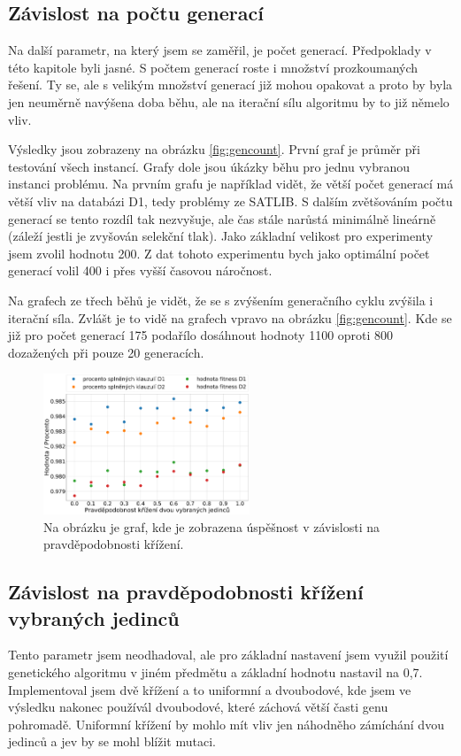 \documentclass[11pt]{article}
\begin{document}
\subsection{Závislost na počtu generací}
Na další parametr, na který jsem se zaměřil, je počet generací. Předpoklady v této kapitole byli jasné. S počtem generací roste i množství prozkoumaných řešení. Ty se, ale s velikým množství generací již mohou opakovat a proto by byla jen neuměrně navýšena doba běhu, ale na iterační sílu algoritmu by to již němelo vliv. 

Výsledky jsou zobrazeny na obrázku \ref{fig:gencount}. První graf je průměr při testování všech instancí. Grafy dole jsou úkázky běhu pro jednu vybranou instanci problému. Na prvním grafu je například vidět, že větší počet generací má větší vliv  na databázi D1, tedy problémy ze SATLIB. S dalším zvětšováním počtu generací se tento rozdíl tak nezvyšuje, ale čas stále narůstá minimálně lineárně (záleží jestli je zvyšován selekční tlak). Jako základní velikost pro experimenty jsem zvolil hodnotu 200. Z dat tohoto experimentu bych jako optimální počet generací volil 400 i přes vyšší časovou náročnost. 

Na grafech ze třech běhů je vidět, že se s zvýšením generačního cyklu zvýšila i iterační síla. Zvlášt je to vidě na grafech vpravo na obrázku \ref{fig:gencount}. Kde se již pro počet generací 175 podařílo dosáhnout hodnoty 1100 oproti 800 dozažených při pouze 20 generacích. 

\begin{figure}
\begin{center}
\includegraphics[width=0.55\textwidth]{img/sat_cross.pdf} 
\caption{Na obrázku je graf, kde je zobrazena úspěšnost v závislosti na pravděpodobnosti křížení.}
\label{fig:cross}
\end{center}
\end{figure}

\subsection{Závislost na pravděpodobnosti křížení vybraných jedinců}
Tento parametr jsem neodhadoval, ale pro základní nastavení jsem využil použití genetického algoritmu v jiném předmětu a základní hodnotu nastavil na 0,7. Implementoval jsem dvě křížení a to uniformní a dvoubodové, kde jsem ve výsledku nakonec používál dvoubodové, které záchová větší časti genu pohromadě. Uniformní křížení by mohlo mít vliv jen náhodněho zámíchání dvou jedinců a jev by se mohl blížit mutaci. 
\end{document}
